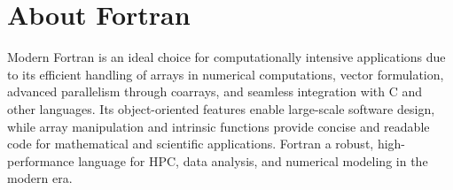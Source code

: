 % 

\section{About Fortran}

Modern Fortran is an ideal choice for computationally intensive applications due to its efficient handling of arrays in numerical computations, vector formulation, advanced parallelism through coarrays, and seamless integration with C and other languages. Its object-oriented features enable large-scale software design, while array manipulation and intrinsic functions provide concise and readable code for mathematical and scientific applications. Fortran a robust, high-performance language for HPC, data analysis, and numerical modeling in the modern era.


